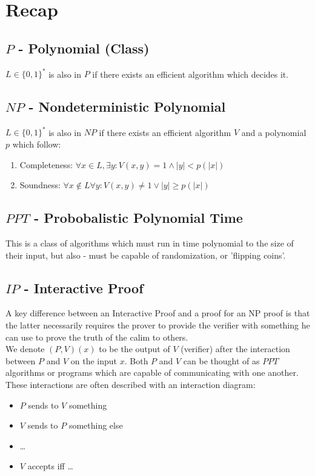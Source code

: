 \section*{Recap}
\subsection*{$P$ - Polynomial (Class)}
$L\in\{0,1\}^*$ is also in $P$ if there exists an efficient algorithm which decides it.

\subsection*{$NP$ - Nondeterministic Polynomial}
$L\in\{0,1\}^*$ is also in $NP$ if there exists an efficient algorithm $V$ and a polynomial $p$ which follow:

\begin{enumerate}
    \item Completeness: $\forall x\in L, \exists y: V(x,y) = 1 \wedge |y|<p(|x|)$
    \item Soundness: $\forall x\notin L \forall y: V(x,y) \neq 1 \vee |y| \geq p(|x|)$
\end{enumerate}

\subsection*{$PPT$ - Probobalistic Polynomial Time}
This is a class of algorithms which must run in time polynomial to the size of their input, but also - must be capable of randomization, or 'flipping coins'.

\subsection*{$IP$ - Interactive Proof}
A key difference between an Interactive Proof and a proof for an NP proof is that the latter necessarily requires the prover to provide the verifier with something he can use to prove the truth of the calim to others.\\

We denote $(P,V)(x)$ to be the output of $V$ (verifier) after the interaction between $P$ and $V$ on the input $x$. Both $P$ and $V$ can be thought of as $PPT$ algorithms or programs which are capable of communicating with one another.\\

These interactions are often described with an interaction diagram:
\begin{itemize}
    \item $P$ sends to $V$ something
    \item $V$ sends to $P$ something else
    \item \dots
    \item $V$ accepts iff \dots
\end{itemize}

